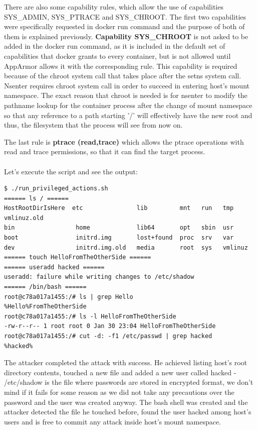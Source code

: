 There are also some capability rules, which allow the use of capabilities SYS\_ADMIN, SYS\_PTRACE and SYS\_CHROOT. The first two capabilities were specifically requested in docker run command and the purpose of both of them is explained previously. \textbf{Capability SYS\_CHROOT} is not asked to be added in the docker run command, as it is included in the default set of capabilities that docker grants to every container, but is not allowed until AppArmor allows it with the corresponding rule. This capability is required because of the chroot system call that takes place after the setns system call. Nsenter requires chroot system call in order to succeed in entering host's mount namespace. The exact reason that chroot is needed is for nsenter to modify the pathname lookup for the container process after the change of mount namespace so that any reference to a path starting '/' will effectively have the new root and thus, the filesystem that the process will see from now on. 

The last rule is \textbf{ptrace (read,trace)} which allows the ptrace operations with read and trace permissions, so that it can find the target process.
\\
\\
Let's execute the script and see the output:
\begin{lstlisting}[style=terminal]
$ ./run_privileged_actions.sh 
====== ls / ======
HostRootDirIsHere  etc               lib         mnt   run   tmp      vmlinuz.old
bin                 home             lib64       opt   sbin  usr
boot                initrd.img       lost+found  proc  srv   var
dev                 initrd.img.old   media       root  sys   vmlinuz  
====== touch HelloFromTheOtherSide ======
====== useradd hacked ======
useradd: failure while writing changes to /etc/shadow
====== /bin/bash ======
root@c78a017a1455:/# ls | grep Hello
%Hello%FromTheOtherSide
root@c78a017a1455:/# ls -l HelloFromTheOtherSide 
-rw-r--r-- 1 root root 0 Jan 30 23:04 HelloFromTheOtherSide
root@c78a017a1455:/# cut -d: -f1 /etc/passwd | grep hacked
%hacked%
\end{lstlisting}

The attacker completed the attack with success. He achieved listing host's root directory contents, touched a new file and added a new user called hacked - /etc/shadow is the file where passwords are stored in encrypted format, we don't mind if it fails for some reason as we did not take any precautions over the password and the user was created anyway. The bash shell was created and the attacker detected the file he touched before, found the user hacked among host's users and is free to commit any attack inside host's mount namespace.

